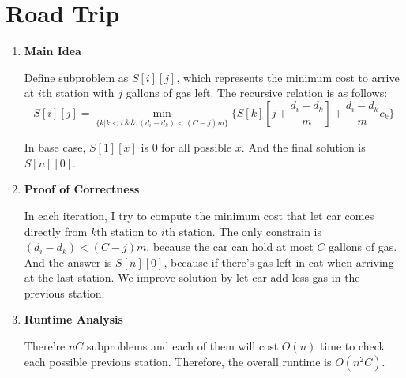 \documentclass[11pt]{article}
\newenvironment{qparts}{\begin{enumerate}[{(}a{)}]}{\end{enumerate}}
\begin{document}
\section{Road Trip}
\begin{qparts}
	\item \textbf{Main Idea}
	
	Define subproblem as $S[i][j]$, which represents the minimum cost to arrive at $i$th station with $j$ gallons of gas left.
	The recursive relation is as follows:
	\[
		S[i][j] = \min_{\{ k | k < i \  \&\& \  (d_i - d_k) < (C - j)m \}} \{ S[k][j + \frac{d_i - d_k}{m}] + \frac{d_i - d_k}{m} c_k \}
	\]
	
	In base case, $S[1][x]$ is 0 for all possible $x$. And the final solution is $S[n][0]$.

	\item \textbf{Proof of Correctness}
	
	In each iteration, I try to compute the minimum cost that let car comes directly from $k$th station to $i$th station. The only constrain is $(d_i - d_k) < (C - j)m$, because the car can hold at most $C$ gallons of gas. And the answer is $S[n][0]$, because if there's gas left in cat when arriving at the last station. We improve solution by let car add less gas in the previous station.
	
	\item \textbf{Runtime Analysis}
	
	There're $nC$ subproblems and each of them will cost $O(n)$ time to check each possible previous station. Therefore, the overall runtime is $O(n^2C)$.
	

\end{qparts}

\newpage
\end{document}
